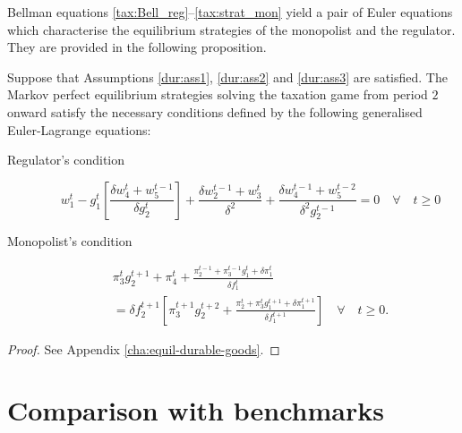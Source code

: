 Bellman equations \eqref{tax:Bell_reg}--\eqref{tax:strat_mon} yield a pair
of Euler equations which characterise the equilibrium strategies of the
monopolist and the regulator. They are provided in the following
proposition. 
\begin{prop}
  Suppose that Assumptions \ref{dur:ass1}, \ref{dur:ass2} and
  \ref{dur:ass3} are satisfied. The Markov perfect equilibrium
  strategies solving the taxation game from period $2$ onward satisfy
  the necessary conditions defined by the following generalised
  Euler-Lagrange equations:
  \begin{description}
  \item[Regulator's condition]
    \begin{equation} \label{reg:euler} w^t_1 - g^t_1 \left[
        \frac{\delta w^t_4 + w^{t-1}_5}{\delta g^t_2} \right] +
      \frac{\delta w^{t-1}_2 + w^t_3}{\delta^2} + \frac{\delta
        w^{t-1}_4 + w^{t-2}_5}{\delta^2 g^{t-1}_2} = 0 \quad \forall
      \quad t \geq 0
    \end{equation}
  \item[Monopolist's condition]
    \begin{multline} \label{mon:euler} \pi^t_3 g^{t+1}_2 + \pi^t_4 +
      \frac{\pi^{t-1}_2 + \pi^{t-1}_3 g^t_1 + \delta\pi^t_1}{\delta
        f^t_1} \\ = \delta f^{t+1}_2 \left[ \pi^{t+1}_3 g^{t+2}_2 +
        \frac{\pi^t_2 + \pi^t_3 g^{t+1}_1 + \delta\pi^{t+1}_1}{\delta
          f^{t+1}_1} \right] \quad \forall \quad t \geq 0.
    \end{multline}
  \end{description}
\end{prop}

\begin{proof}
See Appendix \ref{cha:equil-durable-goods}.
\end{proof}

\section{Comparison with benchmarks}

\label{sec:comp-with-benchm}

